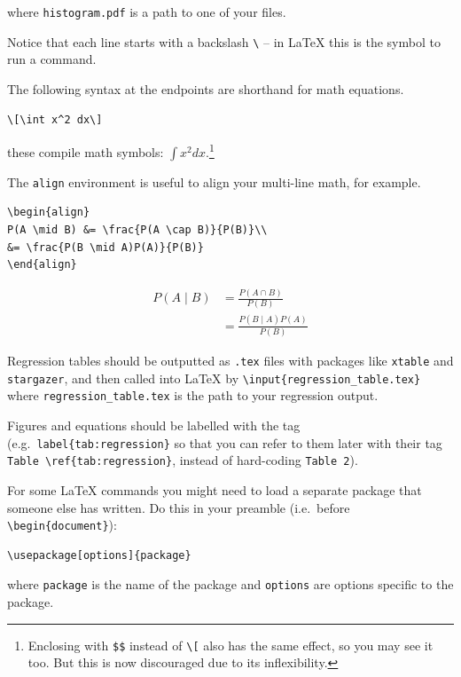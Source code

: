 \documentclass[
]{book}
\theoremstyle{definition}
\theoremstyle{definition}
\theoremstyle{definition}
\theoremstyle{definition}
\theoremstyle{remark}
\begin{document}
where \texttt{histogram.pdf} is a path to one of your files.

Notice that each line starts with a backslash \texttt{\textbackslash{}} -- in LaTeX this is the symbol to run a command.

The following syntax at the endpoints are shorthand for math equations.

\begin{verbatim}
\[\int x^2 dx\]
\end{verbatim}

these compile math symbols: \(\displaystyle \int x^2 dx.\)\footnote{Enclosing with \texttt{\$\$} instead of \texttt{\textbackslash{}{[}} also has the same effect, so you may see it too. But this is now discouraged due to its inflexibility.}

The \texttt{align} environment is useful to align your multi-line math, for example.

\begin{verbatim}
\begin{align}
P(A \mid B) &= \frac{P(A \cap B)}{P(B)}\\
&= \frac{P(B \mid A)P(A)}{P(B)}
\end{align}
\end{verbatim}

\begin{align}
P(A \mid B) &= \frac{P(A \cap B)}{P(B)}\\
&= \frac{P(B \mid A)P(A)}{P(B)}
\end{align}

Regression tables should be outputted as \texttt{.tex} files with packages like \texttt{xtable} and \texttt{stargazer}, and then called into LaTeX by \texttt{\textbackslash{}input\{regression\_table.tex\}} where \texttt{regression\_table.tex} is the path to your regression output.

Figures and equations should be labelled with the tag (e.g.~\texttt{label\{tab:regression\}} so that you can refer to them later with their tag \texttt{Table\ \textbackslash{}ref\{tab:regression\}}, instead of hard-coding \texttt{Table\ 2}).

For some LaTeX commands you might need to load a separate package that someone else has written. Do this in your preamble (i.e.~before \texttt{\textbackslash{}begin\{document\}}):

\begin{verbatim}
\usepackage[options]{package}
\end{verbatim}

where \texttt{package} is the name of the package and \texttt{options} are options specific to the package.
\end{document}

